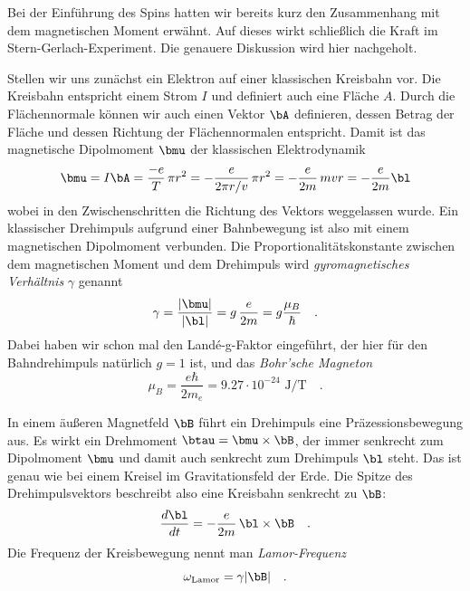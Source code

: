 Bei der Einführung des Spins hatten wir bereits kurz den Zusammenhang mit dem magnetischen Moment erwähnt. Auf dieses wirkt schließlich die Kraft im Stern-Gerlach-Experiment. Die genauere Diskussion wird hier nachgeholt.

Stellen wir uns zunächst ein Elektron auf einer klassischen Kreisbahn vor. Die Kreisbahn entspricht einem Strom $I$ und definiert auch eine Fläche $A$. Durch die Flächennormale können wir auch einen Vektor $\bA$ definieren, dessen Betrag der Fläche und dessen Richtung der Flächennormalen entspricht. Damit ist das magnetische Dipolmoment $\bmu$ der klassischen Elektrodynamik 
\begin{equation}
    \bmu = I \bA = \frac{-e}{T} \, \pi r^2 = - \frac{e}{2\pi r/v} \, \pi r^2 
= -\frac{e}{2m} \, m v r = - \frac{e}{2m} \bl
\end{equation}
wobei in den Zwischenschritten die Richtung des Vektors weggelassen wurde. Ein klassischer Drehimpuls aufgrund einer Bahnbewegung ist also mit einem magnetischen Dipolmoment verbunden. Die Proportionalitätskonstante zwischen dem magnetischen Moment und dem Drehimpuls wird \emph{gyromagnetisches Verhältnis} $\gamma$ genannt
\begin{equation}
    \gamma  = \frac{|\bmu|}{|\bl|} = g \, \frac{e}{2m} = g \frac{\mu_B}{\hbar} \quad .
\end{equation}
Dabei haben wir schon mal den Landé-g-Faktor eingeführt, der hier für den Bahndrehimpuls natürlich $g=1$ ist, und das \emph{Bohr'sche Magneton} 
\begin{equation}
\mu_B = \frac{e \hbar}{2 m_e} = 9.27 \cdot 10^{-24} \text{ J/T}     \quad .
\end{equation}



In einem äußeren Magnetfeld $\bB$ führt ein Drehimpuls eine Präzessionsbewegung aus. Es wirkt ein Drehmoment $\btau = \bmu \times \bB$, der immer senkrecht zum Dipolmoment $\bmu$ und damit auch senkrecht zum Drehimpuls $\bl$ steht. Das ist genau wie bei einem Kreisel im Gravitationsfeld der Erde. Die Spitze des Drehimpulsvektors beschreibt also eine Kreisbahn senkrecht zu $\bB$:
\begin{equation}
    \frac{d \bl}{dt} = - \frac{e}{2m} \, \bl \times \bB  \quad .
\end{equation}
Die Frequenz der Kreisbewegung nennt man \emph{Lamor-Frequenz}
\begin{equation}
    \omega_\text{Lamor} = \gamma | \bB |  \quad .
\end{equation}


